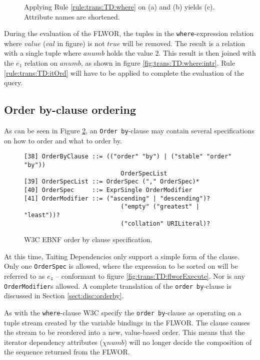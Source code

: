 \begin{myExample}
\begin{figure}[h]
\caption[Example: Evaluation of where clause]{Applying Rule \ref{rule:trans:TD:where} on (a) and (b)
yields (c). Attribute names are shortened. \label{fig:trans:TD:whereClause}}
\end{figure}

During the evaluation of the FLWOR, the tuples in the \texttt{where}-expression relation where $value$ ($val$ in
figure) is not $true$ will be removed. The result is a relation with a single tuple where $anumb$ holds the value
$2$. This result is then joined with the $e_1$ relation on $anumb$, as shown in figure
\ref{fig:trans:TD:where:intr}. Rule \ref{rule:trans:TD:itOrd} will have to be applied to complete the
evaluation of the query.
\end{myExample}


\subsection{Order by-clause ordering}

As can be seen in Figure \ref{fig:trans:TD:ordEBNF}, an \texttt{Order by}-clause may contain several
specifications on how to order and what to order by.
\begin{figure}[h]
\begin{Verbatim}
[38] OrderByClause ::= (("order" "by") | ("stable" "order" "by")) 
                           OrderSpecList
[39] OrderSpecList ::= OrderSpec ("," OrderSpec)*
[40] OrderSpec     ::= ExprSingle OrderModifier
[41] OrderModifier ::= ("ascending" | "descending")? 
                           ("empty" ("greatest" | "least"))? 
                           ("collation" URILiteral)?
\end{Verbatim}
\label{fig:trans:TD:ordEBNF}
\caption[W3C EBNF order by clause specification]{W3C EBNF order by clause specification\cite{w3c00}.}
\end{figure}

At this time, Taiting Dependencies only support a simple form of the clause. Only one \texttt{OrderSpec} is
allowed, where the expression to be sorted on will be referred to as $e_4$ -- conformant to figure
\ref{fig:trans:TD:flworExecute}. Nor is any \texttt{OrderModifier}s allowed. A complete translation of the
\texttt{order by}-clause is discussed in Section \ref{sect:disc:orderby}.

As with the \texttt{where}-clause W3C specify the \texttt{order by}-clause as operating on a tuple stream created
by the variable bindings in the FLWOR\cite{w3c00}. The clause causes the stream to be reordered into a new,
value-based order. This means that the iterator dependency attributes ($\chi{numb}$) will no longer decide the
composition of the sequence returned from the FLWOR.

